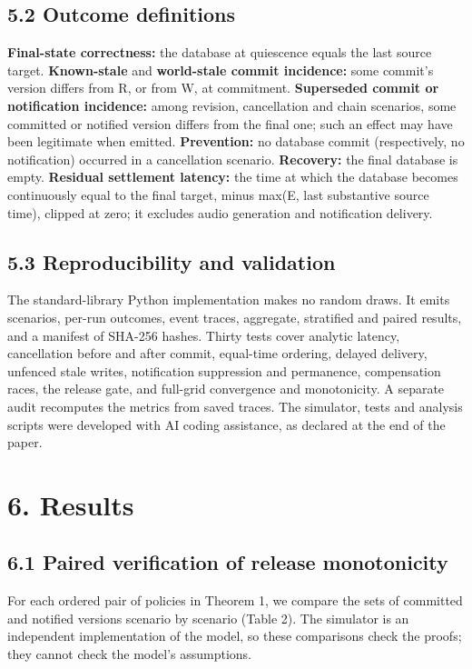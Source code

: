 \documentclass[11pt]{article}
\begin{document}
\subsection*{5.2 Outcome definitions}

\textbf{Final-state correctness:} the database at quiescence equals the last source target. \textbf{Known-stale} and \textbf{world-stale commit incidence:} some commit's version differs from R, or from W, at commitment. \textbf{Superseded commit or notification incidence:} among revision, cancellation and chain scenarios, some committed or notified version differs from the final one; such an effect may have been legitimate when emitted. \textbf{Prevention:} no database commit (respectively, no notification) occurred in a cancellation scenario. \textbf{Recovery:} the final database is empty. \textbf{Residual settlement latency:} the time at which the database becomes continuously equal to the final target, minus max(E, last substantive source time), clipped at zero; it excludes audio generation and notification delivery.


\subsection*{5.3 Reproducibility and validation}

The standard-library Python implementation makes no random draws. It emits scenarios, per-run outcomes, event traces, aggregate, stratified and paired results, and a manifest of SHA-256 hashes. Thirty tests cover analytic latency, cancellation before and after commit, equal-time ordering, delayed delivery, unfenced stale writes, notification suppression and permanence, compensation races, the release gate, and full-grid convergence and monotonicity. A separate audit recomputes the metrics from saved traces. The simulator, tests and analysis scripts were developed with AI coding assistance, as declared at the end of the paper.


\section*{6. Results}

\subsection*{6.1 Paired verification of release monotonicity}

For each ordered pair of policies in Theorem 1, we compare the sets of committed and notified versions scenario by scenario (Table 2). The simulator is an independent implementation of the model, so these comparisons check the proofs; they cannot check the model's assumptions.
\end{document}
